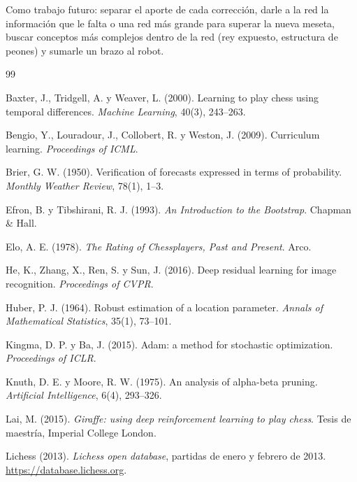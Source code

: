 \documentclass[11pt,a4paper]{article}
\begin{document}
Como trabajo futuro: separar el
aporte de cada corrección, darle a la red la información que le falta o una
red más grande para superar la nueva meseta, buscar conceptos más complejos
dentro de la red (rey expuesto, estructura de peones) y sumarle un brazo al
robot.

\clearpage
\begin{thebibliography}{99}
\setlength{\itemsep}{2pt}\small

Baxter, J., Tridgell, A. y Weaver, L. (2000). Learning to play chess using
temporal differences. \textit{Machine Learning}, 40(3), 243--263.

Bengio, Y., Louradour, J., Collobert, R. y Weston, J. (2009). Curriculum
learning. \textit{Proceedings of ICML}.

Brier, G. W. (1950). Verification of forecasts expressed in terms of
probability. \textit{Monthly Weather Review}, 78(1), 1--3.

Efron, B. y Tibshirani, R. J. (1993). \textit{An Introduction to the
Bootstrap}. Chapman \& Hall.

Elo, A. E. (1978). \textit{The Rating of Chessplayers, Past and Present}.
Arco.

He, K., Zhang, X., Ren, S. y Sun, J. (2016). Deep residual learning for
image recognition. \textit{Proceedings of CVPR}.

Huber, P. J. (1964). Robust estimation of a location parameter.
\textit{Annals of Mathematical Statistics}, 35(1), 73--101.

Kingma, D. P. y Ba, J. (2015). Adam: a method for stochastic optimization.
\textit{Proceedings of ICLR}.

Knuth, D. E. y Moore, R. W. (1975). An analysis of alpha-beta pruning.
\textit{Artificial Intelligence}, 6(4), 293--326.

Lai, M. (2015). \textit{Giraffe: using deep reinforcement learning to play
chess}. Tesis de maestría, Imperial College London.

Lichess (2013). \textit{Lichess open database}, partidas de enero y febrero
de 2013. \url{https://database.lichess.org}.


\end{thebibliography}
\end{document}
